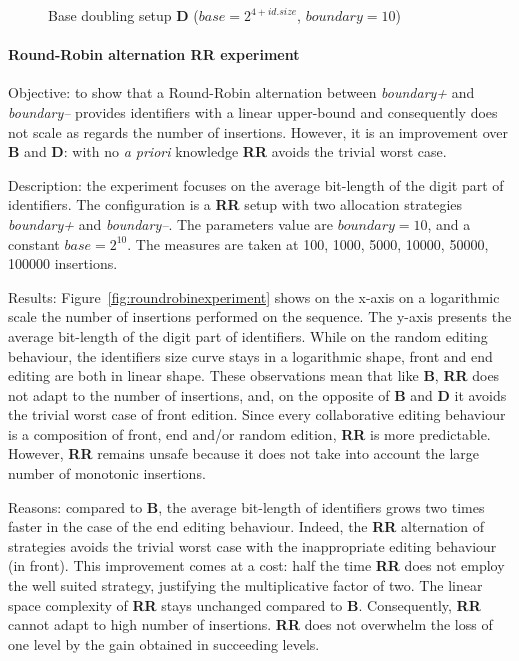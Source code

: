 \begin{figure}
\small
\begin{center}

\caption{Base doubling setup \textbf{D} ($base=2^{4+id.size}$, $boundary=10$)}
\label{fig:doubleexperiment}
\end{center}
\end{figure}

\paragraph{Round-Robin alternation \textbf{RR} experiment}

\begin{asparadesc}
\item[Objective:] to show that a Round-Robin alternation between
  \emph{boundary+} and \emph{boundary--} provides identifiers with a linear
  upper-bound and consequently does not scale as regards the number of
  insertions.  However, it is an improvement over \textbf{B} and \textbf{D}:
  with no \emph{a priori} knowledge \textbf{RR} avoids the trivial worst case.

\item[Description:] the experiment focuses on the average bit-length of the
  digit part of identifiers. The configuration is a \textbf{RR} setup with two
  allocation strategies \emph{boundary+} and \emph{boundary--}. The parameters
  value are $boundary=10$, and a constant $base=2^{10}$. The measures are taken
  at 100, 1000, 5000, 10000, 50000, 100000 insertions.

\item[Results:] Figure~\ref{fig:roundrobinexperiment} shows on the x-axis on a
  logarithmic scale the number of insertions performed on the sequence. The
  y-axis presents the average bit-length of the digit part of identifiers.
  While on the random editing behaviour, the identifiers size curve stays in a
  logarithmic shape, front and end editing are both in linear shape. These
  observations mean that like \textbf{B}, \textbf{RR} does not adapt to the
  number of insertions, and, on the opposite of \textbf{B} and \textbf{D} it
  avoids the trivial worst case of front edition. Since every collaborative
  editing behaviour is a composition of front, end and/or random edition,
  \textbf{RR} is more predictable. However, \textbf{RR} remains unsafe because
  it does not take into account the large number of monotonic insertions.

\item[Reasons:] compared to \textbf{B}, the average bit-length of identifiers
  grows two times faster in the case of the end editing behaviour. Indeed, the
  \textbf{RR} alternation of strategies avoids the trivial worst case with the
  inappropriate editing behaviour (in front). This improvement comes at a cost:
  half the time \textbf{RR} does not employ the well suited strategy,
  justifying the multiplicative factor of two. The linear space complexity of
  \textbf{RR} stays unchanged compared to \textbf{B}. Consequently, \textbf{RR}
  cannot adapt to high number of insertions. \textbf{RR} does not overwhelm the
  loss of one level by the gain obtained in succeeding levels.
\end{asparadesc}

